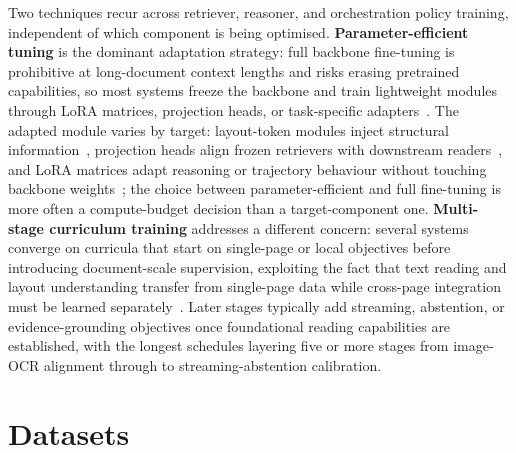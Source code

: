 \documentclass[11pt]{article}
\begin{document}
Two techniques recur across retriever, reasoner, and orchestration policy training, independent of which component is being optimised. \textbf{Parameter-efficient tuning} is the dominant adaptation strategy: full backbone fine-tuning is prohibitive at long-document context lengths and risks erasing pretrained capabilities, so most systems freeze the backbone and train lightweight modules through LoRA matrices, projection heads, or task-specific adapters~\cite{zhu2025laytokenllm,zhang2024cream,qian2026accurate,zhang2026docdancer}. The adapted module varies by target: layout-token modules inject structural information~\cite{zhu2025laytokenllm}, projection heads align frozen retrievers with downstream readers~\cite{qian2026accurate}, and LoRA matrices adapt reasoning or trajectory behaviour without touching backbone weights~\cite{zhang2024cream,zhang2026docdancer}; the choice between parameter-efficient and full fine-tuning is more often a compute-budget decision than a target-component one. \textbf{Multi-stage curriculum training} addresses a different concern: several systems converge on curricula that start on single-page or local objectives before introducing document-scale supervision, exploiting the fact that text reading and layout understanding transfer from single-page data while cross-page integration must be learned separately~\cite{hu2025mplugdocowl2,hannan2025docslm}. Later stages typically add streaming, abstention, or evidence-grounding objectives once foundational reading capabilities are established, with the longest schedules layering five or more stages from image-OCR alignment through to streaming-abstention calibration.

\section{Datasets} 
\label{sec:datasets}
\end{document}

